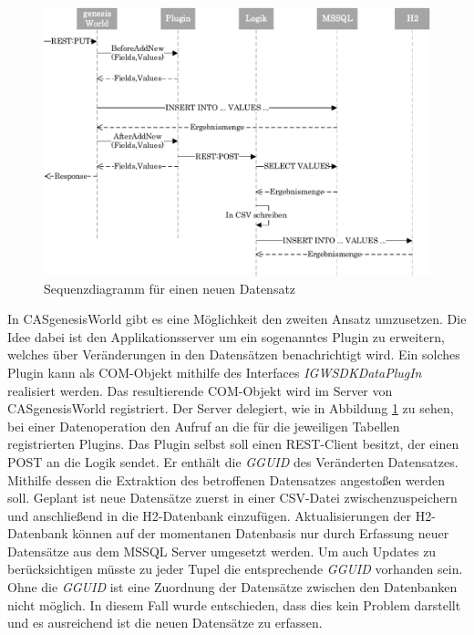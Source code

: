 \begin{figure}[htbp]
\centering
  \includegraphics[width=1.0\textwidth, width=1.0\textwidth]{pics/sequenzdiagramm.pdf}
\caption{Sequenzdiagramm für einen neuen Datensatz}
\label{konzept_sequenz}
\end{figure}

In CASgenesisWorld gibt es eine Möglichkeit den zweiten Ansatz umzusetzen. Die Idee dabei ist den Applikationsserver um ein sogenanntes Plugin zu erweitern, welches über Veränderungen in den Datensätzen benachrichtigt wird. Ein solches Plugin kann als COM-Objekt mithilfe des Interfaces \textit{IGWSDKDataPlugIn} realisiert werden. Das resultierende COM-Objekt wird im Server von CASgenesisWorld registriert. Der Server delegiert, wie in Abbildung \ref{konzept_sequenz} zu sehen, bei einer Datenoperation den Aufruf an die für die jeweiligen Tabellen registrierten Plugins. Das Plugin selbst soll einen REST-Client besitzt, der einen POST an die Logik sendet. Er enthält die \textit{GGUID} des Veränderten Datensatzes. Mithilfe dessen die Extraktion des betroffenen Datensatzes angestoßen werden soll. Geplant ist neue Datensätze zuerst in einer CSV-Datei zwischenzuspeichern und anschließend in die H2-Datenbank einzufügen. Aktualisierungen der H2-Datenbank können auf der momentanen Datenbasis nur durch Erfassung neuer Datensätze aus dem MSSQL Server umgesetzt werden. Um auch Updates zu berücksichtigen müsste zu jeder Tupel die entsprechende \textit{GGUID} vorhanden sein. Ohne die \textit{GGUID} ist eine Zuordnung der Datensätze zwischen den Datenbanken nicht möglich. In diesem Fall wurde entschieden, dass dies kein Problem darstellt und es ausreichend ist die neuen Datensätze zu erfassen.

